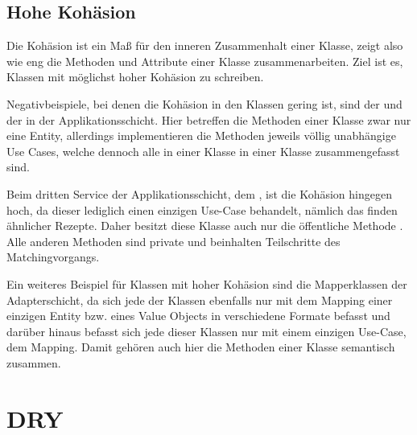 \subsection{Hohe Kohäsion}
Die Kohäsion ist ein Maß für den inneren Zusammenhalt einer Klasse, zeigt also wie eng die Methoden und Attribute einer Klasse zusammenarbeiten. Ziel ist es, Klassen mit möglichst hoher Kohäsion zu schreiben.

Negativbeispiele, bei denen die Kohäsion in den Klassen gering ist, sind der  und der  in der Applikationsschicht. Hier betreffen die Methoden einer Klasse zwar nur eine Entity, allerdings implementieren die Methoden jeweils völlig unabhängige Use Cases, welche dennoch alle in einer Klasse in einer Klasse zusammengefasst sind.

Beim dritten Service der Applikationsschicht, dem , ist die Kohäsion hingegen hoch, da dieser lediglich einen einzigen Use-Case behandelt, nämlich das finden ähnlicher Rezepte. Daher besitzt diese Klasse auch nur die öffentliche Methode . Alle anderen Methoden sind private und beinhalten Teilschritte des Matchingvorgangs.

Ein weiteres Beispiel für Klassen mit hoher Kohäsion sind die Mapperklassen der Adapterschicht, da sich jede der Klassen ebenfalls nur mit dem Mapping einer einzigen Entity bzw. eines Value Objects in verschiedene Formate befasst und darüber hinaus befasst sich jede dieser Klassen nur mit einem einzigen Use-Case, dem Mapping. Damit gehören auch hier die Methoden einer Klasse semantisch zusammen.

\section{DRY}
